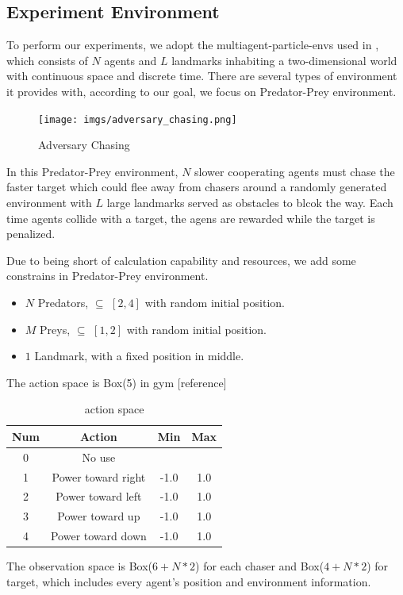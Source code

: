 \documentclass[11pt,twocolumn]{jarticle} %
\begin{document}
\subsection{Experiment Environment}
To perform our experiments, we adopt the multiagent-particle-envs used in \cite{maddpg}, which consists of $N$ agents and $L$ landmarks inhabiting a two-dimensional world with continuous space and discrete time. There are several types of environment it provides with, according to our goal, we focus on Predator-Prey environment.
\begin{figure}[ht]
 \begin{center}
  \texttt{[image: imgs/adversary\_chasing.png]}
  \caption{Adversary Chasing}\label{fig:adversaryChasing}
 \end{center}
\end{figure}
In this Predator-Prey environment, $N$ slower cooperating agents must chase the faster target which could flee away from chasers around a randomly generated environment with $L$ large landmarks served as obstacles to blcok the way. Each time agents collide with a target, the agens are rewarded while the target is penalized. \par
Due to being short of calculation capability and resources, we add some constrains in Predator-Prey environment.
\begin{itemize}
  \item $N$ Predators, $\subseteq$ $[2, 4]$ with random initial position.
  \item $M$ Preys, $\subseteq$ $[1, 2]$ with random initial position.
  \item $1$ Landmark, with a fixed position in middle.
\end{itemize}
The action space is Box(5) in gym [reference]
\begin{table}[ht]
 \caption{action space} 
 \label{tbl:action}
  \begin{center}
    \begin{tabular}{c|ccc}
  Num  & Action & Min & Max\\
  \hline \hline
  0 & No use &  & \\
  1 & Power toward right & -1.0 & 1.0\\
  2 & Power toward left & -1.0 & 1.0\\
  3 & Power toward up & -1.0 & 1.0\\
  4 & Power toward down & -1.0 & 1.0\\\hline
    \end{tabular}
  \end{center}
\end{table}
The observation space is Box($6+N*2$) for each chaser and Box($4+N*2$) for target, which includes every agent's position and environment information.
\end{document}
